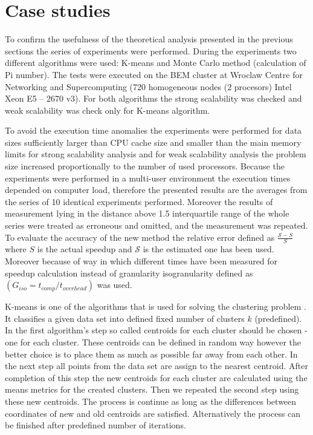 \documentclass[runningheads]{llncs}
\begin{document}
\section{Case studies}
To confirm the usefulness of the theoretical analysis presented in the previous
sections the series of experiments were performed. During the experiments two different algorithms were
used: K-means and Monte Carlo method (calculation of Pi number). The tests were executed on the BEM cluster at Wroclaw Centre for Networking and Supercomputing (720 homogeneous nodes (2 procesors) Intel Xeon E5 – 2670 v3).  
For both algorithms the strong scalability was checked and weak scalability was check only for K-means algorithm.

To avoid the execution time anomalies \cite{kwiatkowski_2} the experiments were performed for data sizes
sufficiently larger than CPU cache size and smaller than the main memory limits for strong scalability analysis and for weak scalability analysis the problem size increased proportionally to the number of used processors. Because the experiments were performed in a multi-user environment the execution times depended on computer load, therefore the presented results are the averages from the series of 10 identical experiments performed. Moreover the results of measurement lying in the distance above 1.5 interquartile range of the whole series were treated as erroneous and omitted, and the measurement was repeated. To evaluate the accuracy of the new method the relative error defined as $\frac{\mathcal{S} - S}{S}$ where $S$ is the actual speedup and $\mathcal{S}$ is the estimated one has been used. Moreover because of way in which different times have been measured for speedup calculation instead of granularity isogranularity defined as $(G_{iso}=t_{comp}/t_{overhead})$ was used. 

K-means is one of the algorithms that is used for solving the clustering problem \cite{macqueen}. It classifies a given data set into defined fixed number of clusters $k$ (predefined). In the first algorithm's step so called centroids for each cluster should be chosen - one for each cluster. These centroids can be defined in random way however the better choice is to place them as much as possible far away from each other. In the next step all points from the data set are assign to the nearest centroid. After completion of this step the new centroids for each cluster are calculated using the means metrics for the created clusters. Then we repeated the second step using these new centroids. The process is continue as long as the differences between coordinates of new and old centroids are satisfied. Alternatively the process can be finished after predefined number of iterations. 
\end{document}
